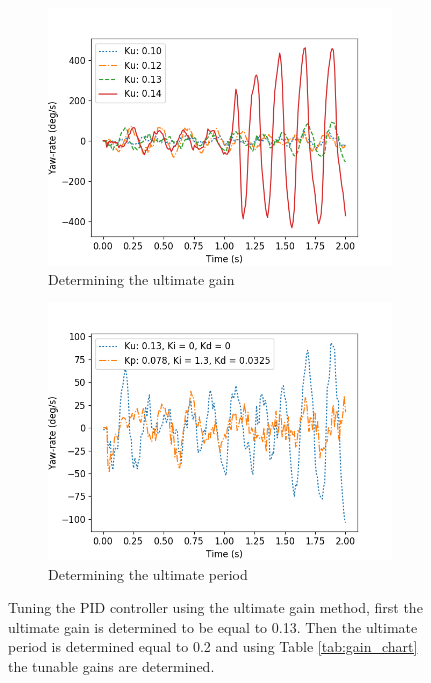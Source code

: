 \begin{figure}
	\begin{subfigure}[b]{0.49\textwidth}
		\includegraphics[width=\textwidth]{pics/straight_ku.png}
		\caption{Determining the ultimate gain}
		\label{fig:ultimate_gain}
	\end{subfigure}
	\begin{subfigure}[b]{0.49\textwidth}
		\includegraphics[width=\textwidth]{pics/straight_ku_with_tu.png}
		\caption{Determining the ultimate period}
		\label{fig:gain_tuning}
	\end{subfigure}
	\caption{Tuning the PID controller using the ultimate gain method, first the ultimate gain is determined to be equal to 0.13. Then the ultimate period is determined equal to 0.2 and using Table \ref{tab:gain_chart} the tunable gains are determined.}
\end{figure}

